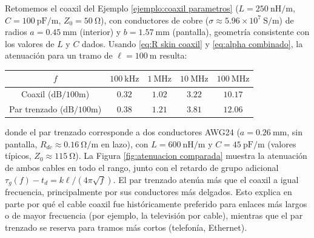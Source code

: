 \begin{ejemplo}\label{ejemplo:H canal}
Retomemos el coaxil del Ejemplo \ref{ejemplo:coaxil parametros} ($L=250\ \unit{\nano\henry\per\meter}$, $C=100\ \unit{\pico\farad\per\meter}$, $Z_0=50\ \unit{\ohm}$), con conductores de cobre ($\sigma\approx 5.96\times 10^7\ \unit{\siemens\per\meter}$) de radios $a=0.45\ \unit{\milli\meter}$ (interior) y $b=1.57\ \unit{\milli\meter}$ (pantalla), geometría consistente con los valores de $L$ y $C$ dados. Usando \eqref{eq:R skin coaxil} y \eqref{eq:alpha combinado}, la atenuación para un tramo de $\ell=100\ \unit{\meter}$ resulta:
\begin{center}
\begin{tabular}{c|cccc}
    $f$ & $100\ \unit{\kilo\hertz}$ & $1\ \unit{\mega\hertz}$ & $10\ \unit{\mega\hertz}$ & $100\ \unit{\mega\hertz}$ \\ \hline
    Coaxil ($\unit{\deci\bel}/100\unit{\meter}$) & $0.32$ & $1.02$ & $3.22$ & $10.17$ \\
    Par trenzado ($\unit{\deci\bel}/100\unit{\meter}$) & $0.38$ & $1.21$ & $3.81$ & $12.06$
\end{tabular}
\end{center}
donde el par trenzado corresponde a dos conductores AWG24 ($a=0.26\ \unit{\milli\meter}$, sin pantalla, $R_{dc}\approx 0.16\ \unit{\ohm\per\meter}$ en lazo), con $L=600\ \unit{\nano\henry\per\meter}$ y $C=45\ \unit{\pico\farad\per\meter}$ (valores típicos, $Z_0\approx 115\ \unit{\ohm}$). La Figura \ref{fig:atenuacion comparada} muestra la atenuación de ambos cables en todo el rango, junto con el retardo de grupo adicional $\tau_g(f)-t_d=k\ell/(4\pi\sqrt f)$. El par trenzado atenúa más que el coaxil a igual frecuencia, principalmente por sus conductores más delgados. Esto explica en parte por qué el cable coaxil fue históricamente preferido para enlaces más largos o de mayor frecuencia (por ejemplo, la televisión por cable), mientras que el par trenzado se reserva para tramos más cortos (telefonía, Ethernet).
\end{ejemplo}

